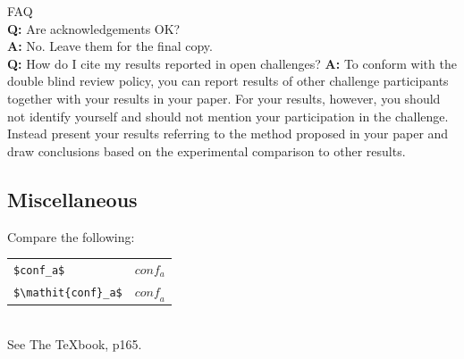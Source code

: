 \documentclass[10pt,twocolumn,letterpaper]{article}
\begin{document}
\noindent
FAQ\medskip\\
{\bf Q:} Are acknowledgements OK?\\
{\bf A:} No.  Leave them for the final copy.\medskip\\
{\bf Q:} How do I cite my results reported in open challenges?
{\bf A:} To conform with the double blind review policy, you can report results of other challenge participants together with your results in your paper. For your results, however, you should not identify yourself and should not mention your participation in the challenge. Instead present your results referring to the method proposed in your paper and draw conclusions based on the experimental comparison to other results.\medskip\\




\subsection{Miscellaneous}

\noindent
Compare the following:\\
\begin{tabular}{ll}
 \verb'$conf_a$' &  $conf_a$ \\
 \verb'$\mathit{conf}_a$' & $\mathit{conf}_a$
\end{tabular}\\
See The \TeX book, p165.

%
%
%
\end{document}
